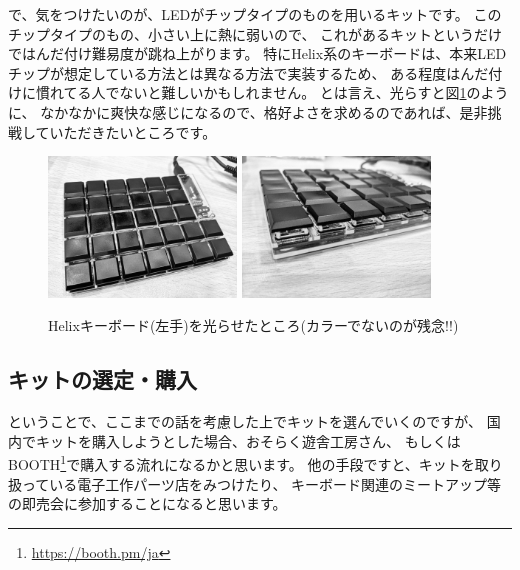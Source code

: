 \documentclass[mingoth,a4paper]{jsarticle}
\begin{document}
で、気をつけたいのが、LEDがチップタイプのものを用いるキットです。
このチップタイプのもの、小さい上に熱に弱いので、
これがあるキットというだけではんだ付け難易度が跳ね上がります。
特にHelix系のキーボードは、本来LEDチップが想定している方法とは異なる方法で実装するため、
ある程度はんだ付けに慣れてる人でないと難しいかもしれません。
とは言え、光らすと図\ref{fig:helix-katsu-lightning}のように、
なかなかに爽快な感じになるので、格好よさを求めるのであれば、是非挑戦していただきたいところです。

\begin{figure}[htbp]
 \begin{center}
  \includegraphics[keepaspectratio,width=5cm]{./image201911-kansai-02/helix-lightning.jpg}
  \hspace*{2zw}
  \includegraphics[keepaspectratio,width=5cm]{./image201911-kansai-02/helix-lightning2.jpg}
 \end{center}
 \vspace*{-1zw}
 \caption{Helixキーボード(左手)を光らせたところ(カラーでないのが残念!!)}
 \label{fig:helix-katsu-lightning}
\end{figure}

\subsection{キットの選定・購入}

ということで、ここまでの話を考慮した上でキットを選んでいくのですが、
国内でキットを購入しようとした場合、おそらく遊舎工房さん、
もしくはBOOTH\footnote{\url{https://booth.pm/ja}}で購入する流れになるかと思います。
他の手段ですと、キットを取り扱っている電子工作パーツ店をみつけたり、
キーボード関連のミートアップ等の即売会に参加することになると思います。
\end{document}
